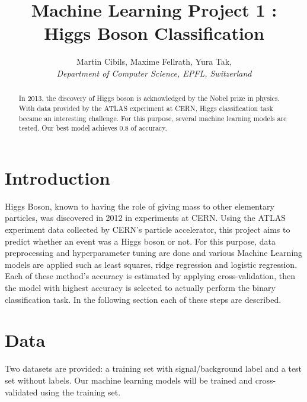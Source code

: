 \documentclass[10pt,conference,compsocconf]{IEEEtran}
\begin{document}
\title{Machine Learning Project 1 : Higgs Boson Classification}

\author{
  Martin Cibils, Maxime Fellrath, Yura Tak, \\
  \textit{Department of Computer Science, EPFL, Switzerland}
}

\maketitle

\begin{abstract}
  In 2013, the discovery of Higgs boson is acknowledged by the Nobel prize in physics. With data provided by the ATLAS experiment at CERN, Higgs classification task became an interesting challenge. For this purpose, several machine learning models are tested. Our best model achieves 0.8 of accuracy.
\end{abstract}

\section{Introduction}

Higgs Boson, known to having the role of giving mass to other elementary particles, was discovered in 2012 in experiments at CERN. Using the ATLAS experiment data collected by CERN's particle accelerator, this project aims to predict whether an event was a Higgs boson or not. For this purpose, data preprocessing and hyperparameter tuning are done and various Machine Learning models are applied such as least squares, ridge regression and logistic regression. Each of these method's accuracy is estimated by applying cross-validation, then the model with highest accuracy is selected to actually perform the binary classification task. In the following section each of these steps are described.

\section{Data}
\label{sec:data}

Two datasets are provided: a training set with signal/background label and a test set without labels. Our machine learning models will be trained and cross-validated using the training set.
\end{document}
